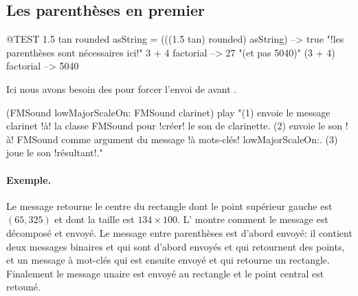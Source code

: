\documentclass[a4paper,10pt,twoside]{book}
\begin{document}
\subsection{Les parenth\`eses en premier}


\begin{code}{@TEST}
1.5 tan rounded asString = (((1.5 tan) rounded) asString) --> true    "!les parenth\`eses sont n\'ecessaires ici!"
3 + 4 factorial   --> 27    "(et pas 5040)"
(3 + 4) factorial --> 5040
\end{code}

Ici nous avons besoin des  pour forcer l'envoi de  avant .
\begin{code}{}
(FMSound lowMajorScaleOn: FMSound clarinet) play 
"(1) envoie le message clarinet !\`a! la classe FMSound pour !cr\'eer! le son de clarinette.
 (2) envoie le son !\`a! FMSound comme argument du message !\`a mots-cl\'es! lowMajorScaleOn:.
 (3) joue le son !r\'esultant!."
\end{code}



\paragraph{Exemple.}
Le message  retourne le centre
du rectangle dont le point sup\'erieur gauche est $(65, 325)$ et dont
la taille est $134{\times}100$. L' montre comment le
message est d\'ecompos\'e et envoy\'e. Le message entre parenth\`eses
est d'abord envoy\'e: il contient deux messages binaires 
et  qui sont d'abord envoy\'es et qui retournent des
points, et un message \`a mot-cl\'es  qui est ensuite
envoy\'e et qui retourne un rectangle. Finalement le message unaire
 est envoy\'e au rectangle et le point central est retoun\'e.
\end{document}
